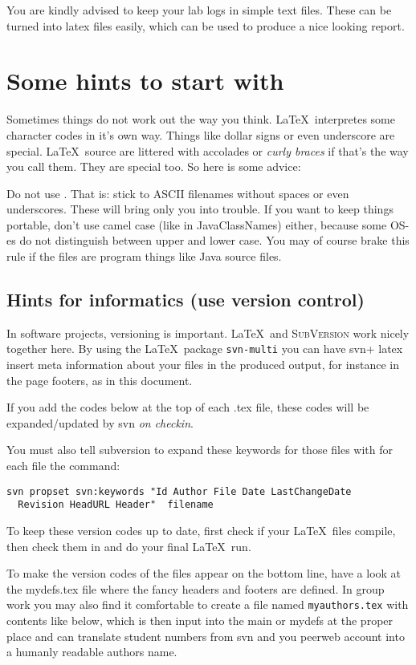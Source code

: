 You are kindly advised to keep your lab logs in simple text
files. These can be turned into latex files easily,
which can be used to produce a nice looking report.
\clearpage 
\section{Some hints to start with}
Sometimes things do not work out the way you think.
\LaTeX\ interpretes some character codes in it's own way.
Things like dollar signs or even underscore are special.
\LaTeX\ source are littered with accolades or \textit{curly braces} if that's
the way you call them. They are special too. So here is some advice: 

Do not use . That is: stick to ASCII filenames without spaces or even underscores. 
These will bring only you into trouble. If you want to keep things portable, 
don't use camel case (like in JavaClassNames) either, because
some OS-es do not distinguish between upper and lower case. You may of
course brake this rule if the files are program things like
Java source files.

\subsection{Hints for informatics (use version control)}
In software projects, versioning is important. \LaTeX\ and \textsc{SubVersion}
work nicely together here.
By using the \LaTeX\ package \texttt{svn-multi} you can have svn+
latex insert meta information about your files in the produced output,
for instance in the page footers, as in this document.

If you add the codes below at the top of each .tex file, these
codes will be expanded/updated by svn \textit{on checkin}. 

You must also tell
subversion to expand these keywords for those files with for each file
the command:\\
{
\begin{lstlisting}[frame=single]
svn propset svn:keywords "Id Author File Date LastChangeDate
  Revision HeadURL Header"  filename
\end{lstlisting}
}
To keep these version codes up to date, first check if your \LaTeX\  files compile,
then check them in and do your final \LaTeX\  run. 

To make the version codes of the files appear on the bottom line, have
a look at the mydefs.tex file where the fancy headers and footers are defined.
In group work you may also find it comfortable to create a file named
\texttt{myauthors.tex} with contents like below, which is then
input into the main or mydefs at the proper place and can translate
student numbers from svn and you peerweb account into a humanly
readable authors name.



